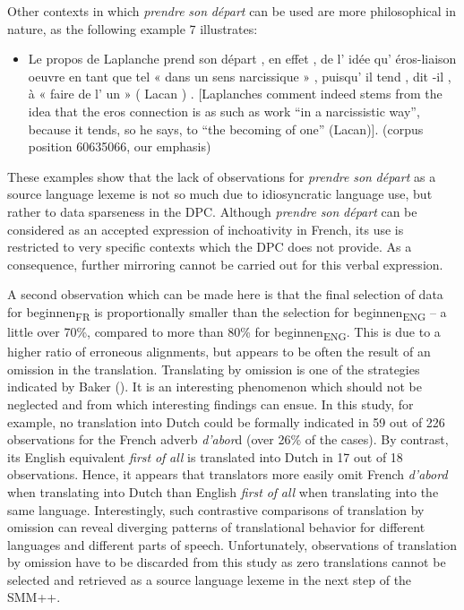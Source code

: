 Other contexts in which \textit{prendre} \textit{son} \textit{départ} can be used are more philosophical in nature, as the following example 7 illustrates:


\begin{itemize}
\item \begin{styleVoorbeeld}
Le propos de Laplanche prend son départ , en effet , de l' idée qu' éros-liaison oeuvre en tant que tel « dans un sens narcissique » , puisqu' il tend , dit -il , à « faire de l' un » ( Lacan ) . [Laplanches comment indeed stems from the idea that the eros connection is as such as work “in a narcissistic way”, because it tends, so he says, to “the becoming of one” (Lacan)]. (corpus position 60635066, our emphasis)
\end{styleVoorbeeld}\end{itemize}

These examples show that the lack of observations for \textit{prendre} \textit{son} \textit{départ} as a source language lexeme is not so much due to idiosyncratic language use, but rather to data sparseness in the DPC. Although \textit{prendre} \textit{son} \textit{départ} can be considered as an accepted expression of inchoativity in French, its use is restricted to very specific contexts which the DPC does not provide. As a consequence, further mirroring cannot be carried out for this verbal expression.



A second observation which can be made here is that the final selection of data for beginnen\textsubscript{FR} is proportionally smaller than the selection for beginnen\textsubscript{ENG} – a little over 70\%, compared to more than 80\% for beginnen\textsubscript{ENG}. This is due to a higher ratio of erroneous alignments, but appears to be often the result of an omission in the translation. Translating by omission is one of the strategies indicated by Baker (\citealt[40]{baker_other_1992}). It is an interesting phenomenon which should not be neglected and from which interesting findings can ensue. In this study, for example, no translation into Dutch could be formally indicated in 59 out of 226 observations for the French adverb \textit{d’abor}d (over 26\% of the cases). By contrast, its English equivalent \textit{first} \textit{of} \textit{all} is translated into Dutch in 17 out of 18 observations. Hence, it appears that translators more easily omit French \textit{d’abord} when translating into Dutch than English \textit{first} \textit{of} \textit{all} when translating into the same language. Interestingly, such contrastive comparisons of translation by omission can reveal diverging patterns of translational behavior for different languages and different parts of speech. Unfortunately, observations of translation by omission have to be discarded from this study as zero translations cannot be selected and retrieved as a source language lexeme in the next step of the SMM++.


